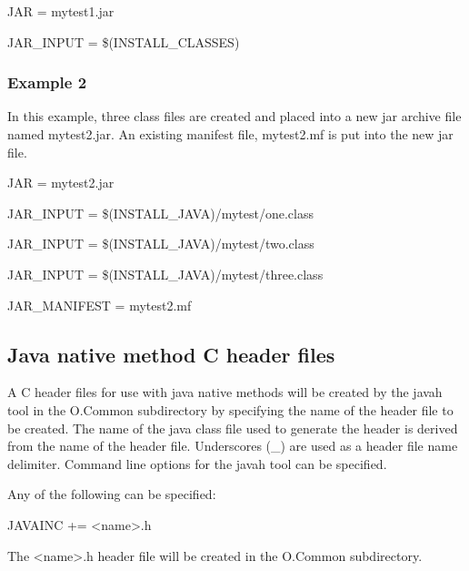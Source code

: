 \begin{description}\item {}JAR = mytest1.jar

\item {}JAR\_INPUT = \$(INSTALL\_CLASSES)

\end{description}\subsubsection{Example 2}

In this example, three class files are created and placed into a new jar archive file named mytest2.jar. An existing manifest 
file, mytest2.mf is put into the new jar file.

\begin{description}\item JAR = mytest2.jar

\item JAR\_INPUT = \$(INSTALL\_JAVA)/mytest/one.class

\item JAR\_INPUT = \$(INSTALL\_JAVA)/mytest/two.class

\item JAR\_INPUT = \$(INSTALL\_JAVA)/mytest/three.class

\item JAR\_MANIFEST = mytest2.mf

\end{description}\subsection{Java native method C header files}

A C header files for use with java native methods will be created by the javah tool in the O.Common subdirectory by 
specifying the name of the header file to be created. The name of the java class file used to generate the header is derived 
from the name of the header file. Underscores (\_) are used as a header file name delimiter. Command line options for the 
javah tool can be specified.

Any of the following can be specified:

\begin{description}\item {}JAVAINC += \textless{}name\textgreater{}.h

\end{description}    The \textless{}name\textgreater{}.h header file will be created in the O.Common subdirectory.


